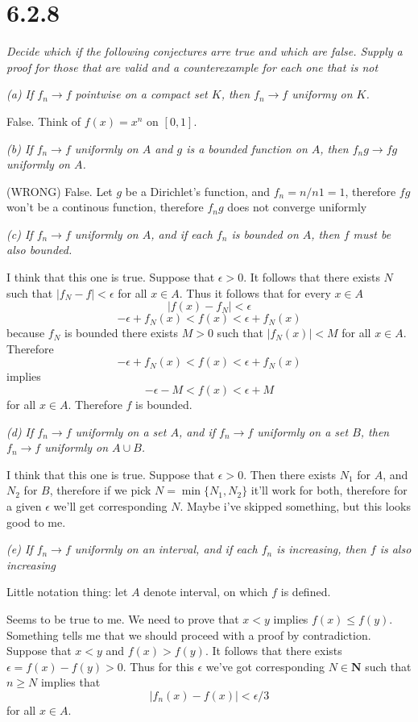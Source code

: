 \documentclass[11pt,oneside,titlepage]{book}
\begin{document}
\section*{6.2.8}
\textit{Decide which if the following conjectures arre true and which are
  false. Supply a proof for those that are valid and a counterexample for
  each one that is not }

\textit{(a) If $f_n \to f$ pointwise on a compact set $K$, then $f_n \to f$
  uniformy on $K$.}

False. Think of $f(x) = x^n$ on $[0, 1]$.

\textit{(b) If $f_n \to f$ uniformly on $A$ and $g$ is a bounded function on
  $A$, then $f_ng \to fg$ uniformly on $A$.}

(WRONG)
False. Let $g$ be a Dirichlet's function, and $f_n = n/n 1 = 1$,
therefore $fg$ won't be a continous function, therefore $f_ng$ does not
converge uniformly

\textit{(c) If $f_n \to f$ uniformly on $A$, and if each $f_n$ is bounded
  on $A$, then $f$ must be also bounded.}

I think that this one is true. Suppose that $\epsilon > 0$. It follows that
there exists $N$ such that $|f_N - f| < \epsilon$ for all $x \in A$. Thus
it follows that for every $x \in A$
$$|f(x) - f_N| < \epsilon$$
$$-\epsilon + f_N(x)< f(x)  < \epsilon + f_N(x)$$
because $f_N$ is bounded there exists $M > 0$ such that
$|f_N(x)| < M$ for all $x \in A$. Therefore
$$-\epsilon + f_N(x)< f(x)  < \epsilon + f_N(x)$$
implies
$$-\epsilon - M < f(x)  < \epsilon + M$$
for all $x \in A$. Therefore $f$ is bounded.

\textit{(d) If $f_n \to f$ uniformly on a set $A$, and if $f_n \to f$ uniformly
  on a set $B$, then $f_n \to f$ uniformly on $A \cup B$.}

I  think that this one is true. Suppose that $\epsilon > 0$. Then there
exists $N_1$ for $A$, and $N_2$ for $B$, therefore if we pick
$N = \min\{N_1, N_2\}$ it'll work for both, therefore for a given $\epsilon$
we'll get corresponding $N$. Maybe i've skipped something, but this looks
good to me.

\textit{(e) If $f_n \to f$ uniformly on an interval, and if each $f_n$ is
  increasing, then $f$ is also increasing}

Little notation thing: let $A$ denote interval, on which $f$ is defined.

Seems to be true to me. We need to prove that $x < y$ implies $f(x) \leq f(y)$.
Something tells me that we should proceed with a proof by contradiction.
Suppose that $x < y$ and $f(x) > f(y)$. It follows that there exists
$\epsilon = f(x) - f(y) > 0$. Thus for this $\epsilon$ we've got
corresponding $N \in \textbf{N}$ such that $n \geq N$ implies that 
$$|f_n(x) - f(x)| < \epsilon/3$$
for all $x \in A$.
\end{document}
